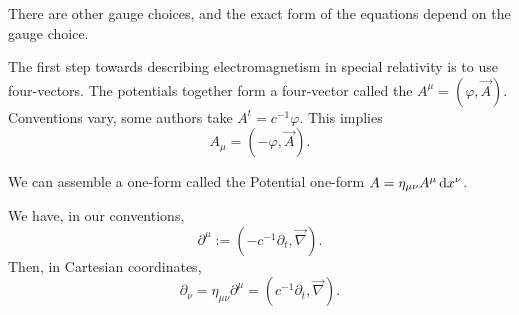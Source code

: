 \begin{remark}
There are other gauge choices, and the exact form of the equations
depend on the gauge choice.
\end{remark}

The first step towards describing electromagnetism in special relativity
is to use four-vectors. The potentials together form a four-vector
called the  $A^{\mu} = (\varphi, \vec{A})$.
Conventions vary, some authors take $A^{t}=c^{-1}\varphi$. This implies
\begin{equation}
A_{\mu} = (-\varphi, \vec{A}).
\end{equation}

\begin{remark}
We can assemble a one-form called the Potential one-form
$A = \eta_{\mu\nu}A^{\mu}\,\mathrm{d} x^{\nu}$.
\end{remark}

We have, in our conventions,
\begin{equation}
\partial^{\mu} := (-c^{-1}\partial_{t}, \vec{\nabla}).
\end{equation}
Then, in Cartesian coordinates,
\begin{equation}
\partial_{\nu} = \eta_{\mu\nu}\partial^{\mu} = (c^{-1}\partial_{t}, \vec{\nabla}).
\end{equation}

